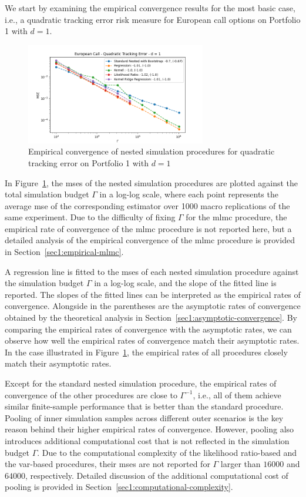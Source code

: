 We start by examining the empirical convergence results for the most basic case, i.e., a quadratic tracking error risk measure for European call options on Portfolio 1 with $d = 1$.

\begin{figure}[ht!]
    \centering
    \includegraphics[width=0.7\textwidth]{./project1/figures/figure1.png}
    \caption{Empirical convergence of nested simulation procedures for quadratic tracking error on Portfolio 1 with $d=1$}
\label{fig1:compareAll} 
\end{figure}
In Figure~\ref{fig1:compareAll}, the \gls{mse}s of the nested simulation procedures are plotted against the total simulation budget $\Gamma$ in a log-log scale, where each point represents the average \gls{mse} of the corresponding estimator over \num{1000} macro replications of the same experiment.
Due to the difficulty of fixing $\Gamma$ for the \gls{mlmc} procedure, the empirical rate of convergence of the \gls{mlmc} procedure is not reported here, but a detailed analysis of the empirical convergence of the \gls{mlmc} procedure is provided in Section~\ref{sec1:empirical-mlmc}.

A regression line is fitted to the \gls{mse}s of each nested simulation procedure against the simulation budget $\Gamma$ in a log-log scale, and the slope of the fitted line is reported.
The slopes of the fitted lines can be interpreted as the empirical rates of convergence.
Alongside in the parentheses are the asymptotic rates of convergence obtained by the theoretical analysis in Section~\ref{sec1:asymptotic-convergence}.
By comparing the empirical rates of convergence with the asymptotic rates, we can observe how well the empirical rates of convergence match their asymptotic rates.
In the case illustrated in Figure~\ref{fig1:compareAll}, the empirical rates of all procedures closely match their asymptotic rates.

Except for the standard nested simulation procedure, the empirical rates of convergence of the other procedures are close to $\Gamma^{-1}$, i.e., all of them achieve similar finite-sample performance that is better than the standard procedure.
Pooling of inner simulation samples across different outer scenarios is the key reason behind their higher empirical rates of convergence.
However, pooling also introduces additional computational cost that is not reflected in the simulation budget $\Gamma$.
Due to the computational complexity of the likelihood ratio-based and the \gls{var}-based procedures, their \gls{mse}s are not reported for $\Gamma$ larger than $\num{16000}$ and $\num{64000}$, respectively.
Detailed discussion of the additional computational cost of pooling is provided in Section~\ref{sec1:computational-complexity}.

